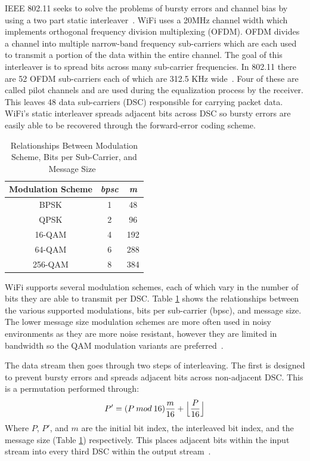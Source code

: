 \documentclass[sigconf]{acmart}
\begin{document}
IEEE 802.11 seeks to solve the problems of bursty errors and channel bias by using a two part static interleaver~\cite{vo2016interleaving}. WiFi uses a 20MHz channel width which implements orthogonal frequency division multiplexing (OFDM). OFDM divides a channel into multiple narrow-band frequency sub-carriers which are each used to transmit a portion of the data within the entire channel. The goal of this interleaver is to spread bits across many sub-carrier frequencies. In 802.11 there are 52 OFDM sub-carriers each of which are 312.5 KHz wide~\cite{kapp2002802}. Four of these are called pilot channels and are used during the equalization process by the receiver. This leaves 48 data sub-carriers (DSC) responsible for carrying packet data. WiFi's static interleaver spreads adjacent bits across DSC so bursty errors are easily able to be recovered through the forward-error coding scheme. 

\begin{table}[ht] 
\begin{tabular}{ccc}
\textbf{Modulation Scheme} & \textit{bpsc} & \textit{m} \\ \hline
BPSK                       & 1             & 48         \\
QPSK                       & 2             & 96         \\
16-QAM                     & 4             & 192        \\
64-QAM                     & 6             & 288        \\
256-QAM                    & 8             & 384       
\end{tabular}
\caption{Relationships Between Modulation Scheme, Bits per Sub-Carrier, and Message Size~\cite{vo2016interleaving}}
\label{tab:802Info}
\end{table}


WiFi supports several modulation schemes, each of which vary in the number of bits they are able to transmit per DSC. Table \ref{tab:802Info} shows the relationships between the various supported modulations, bits per sub-carrier (bpsc), and message size. The lower message size modulation schemes are more often used in noisy environments as they are more noise resistant, however they are limited in bandwidth so the QAM modulation variants are preferred~\cite{kapp2002802}.

The data stream then goes through two steps of interleaving. The first is designed to prevent bursty errors and spreads adjacent bits across non-adjacent DSC. This is a permutation performed through:
$$P'=(P\:mod\:16)\frac{m}{16} + \Bigl\lfloor{\frac{P}{16}}\Bigr\rfloor$$
Where $P$, $P'$, and $m$ are the initial bit index, the interleaved bit index, and the message size (Table \ref{tab:802Info}) respectively. This places adjacent bits within the input stream into every third DSC within the output stream~\cite{vo2016interleaving}. 
\end{document}
